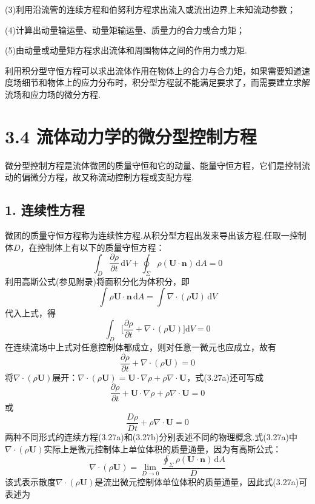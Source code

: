 (3)利用沿流管的连续方程和伯努利方程求出流入或流出边界上未知流动参数；

(4)计算出动量输运量、动量矩输运量、质量力的合力或合力矩；

(5)由动量或动量矩方程求出流体和周围物体之间的作用力或力矩.

利用积分型守恒方程可以求出流体作用在物体上的合力与合力矩，如果需要知道速度场细节和物体上的应力分布时，积分型方程就不能满足要求了，而需要建立求解流场和应力场的微分方程.
\section*{3.4  流体动力学的微分型控制方程}

微分型控制方程是流体微团的质量守恒和它的动量、能量守恒方程，它们是控制流动的偏微分方程，故又称流动控制方程或支配方程.

\subsection*{1. 连续性方程}

微团的质量守恒方程称为连续性方程.从积分型方程出发来导出该方程.任取一控制体$D$，在控制体上有以下的质量守恒方程：
\[
\int_D \frac{\partial\rho}{\partial t}\,\mathrm{d}V+\oint_\Sigma \rho(\boldsymbol{U}\cdot\boldsymbol{n})\,\mathrm{d}A=0
\]
利用高斯公式(参见附录)将面积分化为体积分，即
\[
\int \rho\boldsymbol{U}\cdot\boldsymbol{n}\,\mathrm{d}A=\int \nabla\cdot(\rho\boldsymbol{U})\,\mathrm{d}V
\]
代入上式，得
\[
\int_D \bigg[\frac{\partial\rho}{\partial t}+\nabla\cdot(\rho\boldsymbol{U})\bigg]\mathrm{d}V=0
\]
在连续流场中上式对任意控制体都成立，则对任意一微元也应成立，故有
\begin{equation*}
\frac{\partial\rho}{\partial t}+\nabla\cdot(\rho\boldsymbol{U})=0
\tag{3.27a}
\end{equation*}
将$\nabla\cdot(\rho\boldsymbol{U})$展开：$\nabla\cdot(\rho\boldsymbol{U})=\boldsymbol{U}\cdot\nabla\rho+\rho\nabla\cdot\boldsymbol{U}$，式(3.27a)还可写成
\[
\frac{\partial\rho}{\partial t}+\boldsymbol{U}\cdot\nabla\rho+\rho\nabla\cdot\boldsymbol{U}=0
\]
或
\begin{equation*}
\frac{D\rho}{Dt}+\rho\nabla\cdot\boldsymbol{U}=0
\tag{3.27b}
\end{equation*}
两种不同形式的连续方程(3.27a)和(3.27b)分别表述不同的物理概念.式(3.27a)中$\nabla\cdot(\rho\boldsymbol{U})$实际上是微元控制体上单位体积的质量通量，因为有高斯公式：
\[
\nabla\cdot(\rho\boldsymbol{U})=\lim_{D\to 0}\frac{\displaystyle\oint_\Sigma \rho(\boldsymbol{U}\cdot\boldsymbol{n})\,\mathrm{d}A}{D}
\]
该式表示散度$\nabla\cdot(\rho\boldsymbol{U})$是流出微元控制体单位体积的质量通量，因此式(3.27a)可表述为

